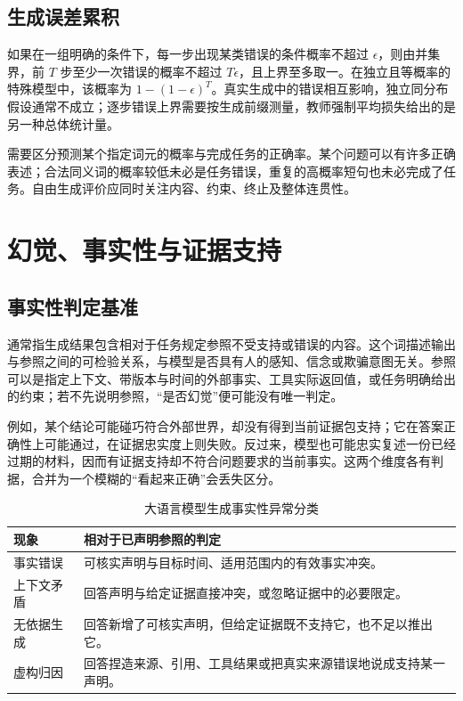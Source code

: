 \documentclass[../textbook.tex]{subfiles}
\begin{document}
\subsection{生成误差累积}
如果在一组明确的条件下，每一步出现某类错误的条件概率不超过 $\epsilon$，则由并集界，前 $T$ 步至少一次错误的概率不超过 $T\epsilon$，且上界至多取一。在独立且等概率的特殊模型中，该概率为 $1-(1-\epsilon)^T$。真实生成中的错误相互影响，独立同分布假设通常不成立；逐步错误上界需要按生成前缀测量，教师强制平均损失给出的是另一种总体统计量。

需要区分预测某个指定词元的概率与完成任务的正确率。某个问题可以有许多正确表述；合法同义词的概率较低未必是任务错误，重复的高概率短句也未必完成了任务。自由生成评价应同时关注内容、约束、终止及整体连贯性。

\section{幻觉、事实性与证据支持}

\subsection{事实性判定基准}
通常指生成结果包含相对于任务规定参照不受支持或错误的内容\cite{ji2023hallucination}。这个词描述输出与参照之间的可检验关系，与模型是否具有人的感知、信念或欺骗意图无关。参照可以是指定上下文、带版本与时间的外部事实、工具实际返回值，或任务明确给出的约束；若不先说明参照，“是否幻觉”便可能没有唯一判定。

例如，某个结论可能碰巧符合外部世界，却没有得到当前证据包支持；它在答案正确性上可能通过，在证据忠实度上则失败。反过来，模型也可能忠实复述一份已经过期的材料，因而有证据支持却不符合问题要求的当前事实。这两个维度各有判据，合并为一个模糊的“看起来正确”会丢失区分。

\begin{table}[htbp]
\centering
\caption{大语言模型生成事实性异常分类}\label{tab:ar-factuality-criteria}
\begin{tabularx}{\linewidth}{@{}lX@{}}
\toprule 现象 & 相对于已声明参照的判定\\\midrule
事实错误 & 可核实声明与目标时间、适用范围内的有效事实冲突。\\
上下文矛盾 & 回答声明与给定证据直接冲突，或忽略证据中的必要限定。\\
无依据生成 & 回答新增了可核实声明，但给定证据既不支持它，也不足以推出它。\\
虚构归因 & 回答捏造来源、引用、工具结果或把真实来源错误地说成支持某一声明。\\
\bottomrule
\end{tabularx}
\end{table}
\end{document}
